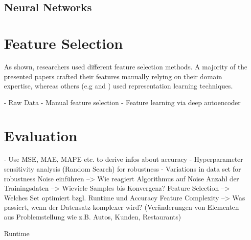 \subsection{Neural Networks}

\section{Feature Selection}

As shown, researchers used different feature selection methods. A majority of the presented papers crafted their features manually relying on their domain expertise, whereas others (e.g \cite{Siripanpornchana2016_AnnWithDbnFS} and \cite{Huang2018_GBDT}) used representation learning techniques.


- Raw Data 
- Manual feature selection
- Feature learning via deep autoencoder

\section{Evaluation} 
- Use MSE, MAE, MAPE etc. to derive infos about accuracy
- Hyperparameter sensitivity analysis (Random Search) for robustness
- Variations in data set for robustness
Noise einführen 
--> Wie reagiert Algorithmus auf Noise
Anzahl der Trainingsdaten 
--> Wieviele Samples bis Konvergenz?
Feature Selection
--> Welches Set optimiert bzgl. Runtime und Accuracy
Feature Complexity
--> Was passiert, wenn der Datensatz komplexer wird? (Veränderungen von Elementen aus Problemstellung wie z.B. Autos, Kunden, Restaurants)

Runtime